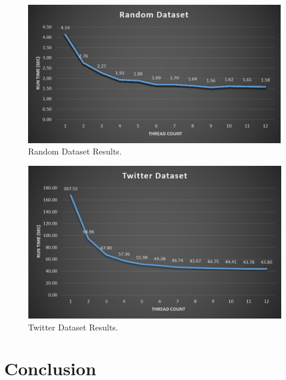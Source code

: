 \documentclass{article}
\begin{document}
\begin{figure}
  \includegraphics[width=\linewidth]{Figure8.jpg}
  \caption{Random Dataset Results.}
  \label{fig:Random}
\end{figure}

\begin{figure}
  \includegraphics[width=\linewidth]{Figure9.jpg}
  \caption{Twitter Dataset Results.}
  \label{fig:Twitter}
\end{figure}

\section{Conclusion}
\end{document}
